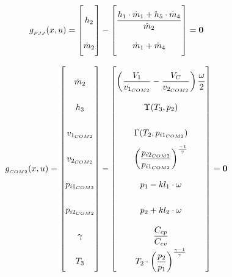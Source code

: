 \begin{equation} \label{eq:Gpjj}\renewcommand{\arraystretch}{2.5}
	g_{_{PJJ}}(x,u) =  \begin{bmatrix}
		h_{2}				\\ %
		\dot{m}_{2}			\\ %
	\end{bmatrix}
	-
	\begin{bmatrix}
		\dfrac{h_{1} \cdot \dot{m}_{1} + h_{5} \cdot \dot{m}_{4}}{ \dot{m}_{2} } \\ 	%
		\dot{m}_{1} + \dot{m}_{4} \\													%
	\end{bmatrix}
	=\textbf{0}
\end{equation}


\begin{equation} \label{eq:Gcs2}\renewcommand{\arraystretch}{2.5}
	g_{_{COM2}}(x,u) =  \begin{bmatrix}
		\dot{m}_2     \\ %
		h_{3}         \\ %
		v_{1_{COM2}}  \\ %
		v_{2_{COM2}}  \\ %
		p_{i1_{COM2}} \\ %
		p_{i2_{COM2}} \\ %
		\gamma        \\ %
		T_{3}         \\ %
	\end{bmatrix}
	-
	\begin{bmatrix}
		\left(\dfrac{V_1}{v_{1_{COM2}}} - \dfrac{V_C}{v_{2_{COM2}}}\right) \dfrac{\omega}{2} \\			%
		\Upsilon(T_{3}, p_{2})		\\													%
		\Gamma(T_{2},p_{i1_{COM2}}) \\													%
		\left(\dfrac{p_{i2_{COM2}}}{p_{i1_{COM2}}}\right)^{\frac{-1}{\gamma}} \\		%
		p_{1} - kl_1 \cdot \omega \\													%
		p_{2} + kl_2 \cdot \omega \\													%
		\dfrac{C_{cp}}{C_{cv}} \\														%
		T_{2}\cdot \left(\dfrac{p_{2}}{p_{1}}\right)^{\frac{\gamma-1}{\gamma}}	\\		%
	\end{bmatrix}
	=\textbf{0}
\end{equation}


